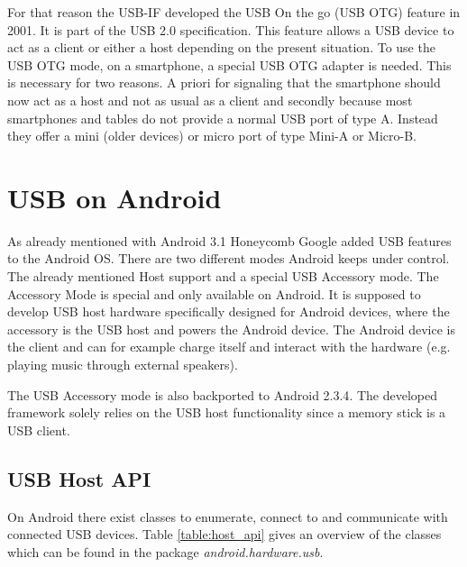 For that reason the USB-IF developed the USB On the go (USB OTG) feature in 2001. It is part of the USB 2.0 specification\cite{wiki_usb}. This feature allows a USB device to act as a client or either a host depending on the present situation. To use the USB OTG mode, on a smartphone, a special USB OTG adapter is needed. This is necessary for two reasons. A priori for signaling that the smartphone should now act as a host and not as usual as a client and secondly because most smartphones and tables do not provide a normal USB port of type A. Instead they offer a mini (older devices) or micro port of type Mini-A or Micro-B\cite{wiki_usb_otg}. 

\chapter{USB on Android}
\label{chapter:usb_on_android}

As already mentioned with Android 3.1 Honeycomb Google added USB features to the Android OS. There are two different modes Android keeps under control. The already mentioned Host support and a special USB Accessory mode. The Accessory Mode is special and only available on Android. It is supposed to develop USB host hardware specifically designed for Android devices, where the accessory is the USB host and powers the Android device\cite{android_usb_accessory}. The Android device is the client and can for example charge itself and interact with the hardware (e.g. playing music through external speakers). 

The USB Accessory mode is also backported to Android 2.3.4\cite{android_usb_accessory}. The developed framework solely relies on the USB host functionality since a memory stick is a USB client.

\section{USB Host API}

On Android there exist classes to enumerate, connect to and communicate with connected USB devices. Table \ref{table:host_api} gives an overview of the classes which can be found in the package \textit{android.hardware.usb}.

